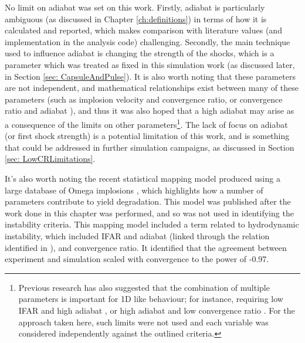 No limit on adiabat was set on this work. Firstly, adiabat is particularly ambiguous (as discussed in Chapter \ref{ch:definitions}) in terms of how it is calculated and reported, which makes comparison with literature values (and implementation in the analysis code) challenging. Secondly, the main technique used to influence adiabat is changing the strength of the shocks, which is a parameter which was treated as fixed in this simulation work (as discussed later, in Section \ref{sec: CapsuleAndPulse}). It is also worth noting that these parameters are not independent, and mathematical relationships exist between many of these parameters (such as implosion velocity and convergence ratio, or convergence ratio and adiabat \cite{Goncharov2013, Landen2021}), and thus it was also hoped that a high adiabat may arise as a consequence of the limits on other parameters\footnote{ Previous research has also suggested that the combination of multiple parameters is important for 1D like behaviour; for instance, requiring low IFAR and high adiabat \cite{Goncharov2014}, or high adiabat and low convergence ratio \cite{Goncharov2003}. For the approach taken here, such limits were not used and each variable was considered independently against the outlined criteria.}. The lack of focus on adiabat (or first shock strength) is a potential limitation of this work, and is something that could be addressed in further simulation campaigns, as discussed in Section \ref{sec: LowCRLimitations}.

It's also worth noting the recent statistical mapping model produced using a large database of Omega implosions \cite{Lees2021}, which highlights how a number of parameters contribute to yield degradation. This model was published after the work done in this chapter was performed, and so was not used in identifying the instability criteria. This mapping model included a term related to hydrodynamic instability, which included IFAR and adiabat (linked through the relation identified in \cite{Goncharov2014}), and convergence ratio. It identified that the agreement between experiment and simulation scaled with convergence to the power of -0.97.


